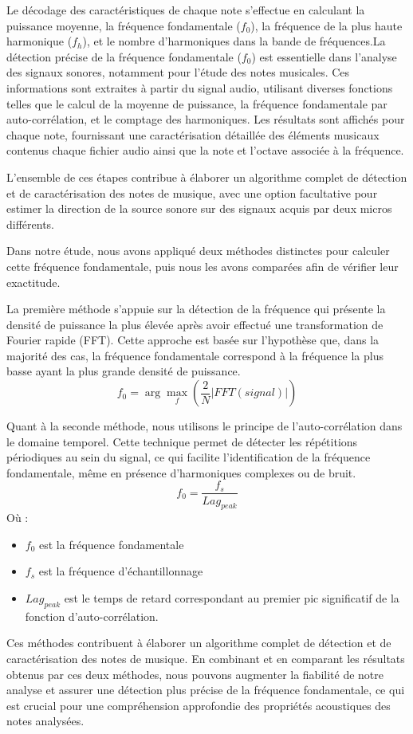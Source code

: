 Le décodage des caractéristiques de chaque note s'effectue en calculant la puissance moyenne, la fréquence fondamentale ($f_0$), la fréquence de la plus haute harmonique ($f_h$), et le nombre d'harmoniques dans la bande de fréquences.La détection précise de la fréquence fondamentale ($f_0$) est essentielle dans l'analyse des signaux sonores, notamment pour l'étude des notes musicales. Ces informations sont extraites à partir du signal audio, utilisant diverses fonctions telles que le calcul de la moyenne de puissance, la fréquence fondamentale par auto-corrélation, et le comptage des harmoniques. Les résultats sont affichés pour chaque note, fournissant une caractérisation détaillée des éléments musicaux contenus chaque fichier audio ainsi que la note et l'octave associée à la fréquence. 

L'ensemble de ces étapes contribue à élaborer un algorithme complet de détection et de caractérisation des notes de musique, avec une option facultative pour estimer la direction de la source sonore sur des signaux acquis par deux micros différents. 

Dans notre étude, nous avons appliqué deux méthodes distinctes pour calculer cette fréquence fondamentale, puis nous les avons comparées afin de vérifier leur exactitude.

La première méthode s'appuie sur la détection de la fréquence qui présente la densité de puissance la plus élevée après avoir effectué une transformation de Fourier rapide (FFT). Cette approche est basée sur l'hypothèse que, dans la majorité des cas, la fréquence fondamentale correspond à la fréquence la plus basse ayant la plus grande densité de puissance.
\begin{equation}
    f_0 = \arg\max_f(\frac{2}{N}|FFT(signal)|)
\end{equation}

Quant à la seconde méthode, nous utilisons le principe de l'auto-corrélation dans le domaine temporel. Cette technique permet de détecter les répétitions périodiques au sein du signal, ce qui facilite l'identification de la fréquence fondamentale, même en présence d'harmoniques complexes ou de bruit.
\begin{equation}
    f_0 = \frac{f_s}{Lag_{peak}}
\end{equation}
Où : 
\begin{itemize}
    \item $f_0$ est la fréquence fondamentale  
    \item $f_s$ est la fréquence d'échantillonnage 
    \item $Lag_{peak}$ est le temps de retard correspondant au premier pic significatif de la fonction d'auto-corrélation.
\end{itemize}

Ces méthodes contribuent à élaborer un algorithme complet de détection et de caractérisation des notes de musique. En combinant et en comparant les résultats obtenus par ces deux méthodes, nous pouvons augmenter la fiabilité de notre analyse et assurer une détection plus précise de la fréquence fondamentale, ce qui est crucial pour une compréhension approfondie des propriétés acoustiques des notes analysées.
